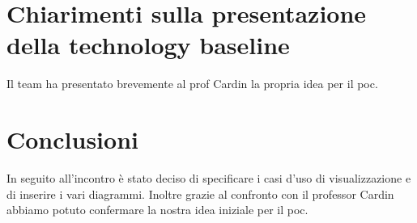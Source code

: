 \section{Chiarimenti sulla presentazione della technology baseline}
Il team ha presentato brevemente al prof Cardin la propria idea per il poc.

\section{Conclusioni}
In seguito all'incontro è stato deciso di specificare i casi d'uso di visualizzazione e di inserire i vari diagrammi. Inoltre grazie al confronto con il professor Cardin abbiamo potuto confermare la nostra idea iniziale per il poc.
